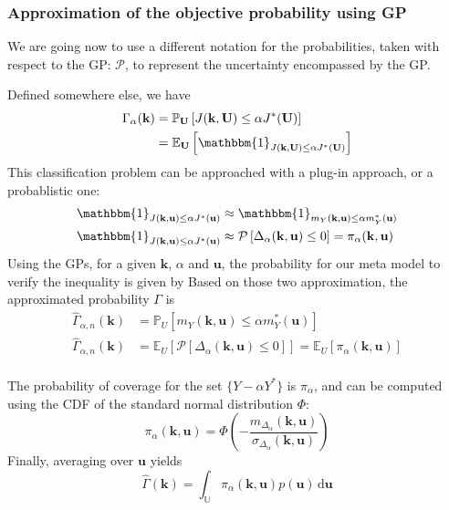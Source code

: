 \documentclass[a4paper,11pt]{article}
\newcommand{\Ex}{\mathbb{E}}
\newcommand{\Prob}{\mathbb{P}}
\newcommand{\ProbGP}{\mathcal{P}}
\newcommand{\Uspace}{\mathbb{U}}
\theoremstyle{defi}
\numberwithin{thmCounter}{section}
\begin{document}
\subsubsection{Approximation of the objective probability using GP}
We are going now to use a different notation for the probabilities, taken with respect to the GP: $\ProbGP$, to represent the uncertainty encompassed by the GP.

Defined somewhere else, we have
\begin{align}
  \Gamma_{\alpha}(\mathbf{k}) &= \Prob_{\mathbf{U}}\left[J(\mathbf{k},\mathbf{U}) \leq \alpha J^*(\mathbf{U})\right] \\
                              & =\Ex_{\mathbf{U}}\left[\mathbbm{1}_{J(\mathbf{k},\mathbf{U}) \leq \alpha J^*(\mathbf{U})}\right]
\end{align}
This classification problem can be approached with a plug-in approach, or a probablistic one:
\begin{align}
  \mathbbm{1}_{J(\mathbf{k},\mathbf{u}) \leq \alpha J^*(\mathbf{u})} &\approx   \mathbbm{1}_{m_Y(\mathbf{k},\mathbf{u}) \leq \alpha m_Y^*(\mathbf{u})} \\
  \mathbbm{1}_{J(\mathbf{k},\mathbf{u}) \leq \alpha J^*(\mathbf{u})} &\approx   \ProbGP\left[ \Delta_{\alpha}(\mathbf{k},\mathbf{u}) \leq 0 \right] = \pi_{\alpha}(\mathbf{k},\mathbf{u})
\end{align}
Using the GPs, for a given $\mathbf{k}$, $\alpha$ and $\mathbf{u}$, the probability for our meta model to verify the inequality is given by
Based on those two approximation, the approximated probability $\Gamma$ is
\begin{align}
  \hat{\Gamma}_{\alpha, n}(\mathbf{k}) &= \Prob_U\left[m_Y(\mathbf{k},\mathbf{u}) \leq \alpha m_Y^*(\mathbf{u}) \right] \tag{plug-in} \\
  \hat{\Gamma}_{\alpha, n}(\mathbf{k}) &= \Ex_U\left[ \ProbGP\left[ \Delta_{\alpha}(\mathbf{k},\mathbf{u}) \leq 0\right]\right]  = \Ex_U\left[\pi_{\alpha}(\mathbf{k},\mathbf{u})\right]\tag{Probabilistic approx} \\
\end{align}

The probability of coverage for the set $\{Y - \alpha Y^*\}$ is $\pi_{\alpha}$, and can be computed using the CDF of the standard normal distribution $\Phi$:
\begin{equation}
  \pi_{\alpha}(\mathbf{k},\mathbf{u}) = \Phi\left(-\frac{m_{\Delta_\alpha}(\mathbf{k},\mathbf{u})}{\sigma_{\Delta_\alpha}(\mathbf{k},\mathbf{u})}\right)
\end{equation}
Finally, averaging over $\mathbf{u}$ yields
\begin{equation}
  \hat{\Gamma}(\mathbf{k}) = \int_{\Uspace}\pi_{\alpha}(\mathbf{k},\mathbf{u})p(\mathbf{u}) \,\mathrm{d}\mathbf{u}
\end{equation}
\end{document}
